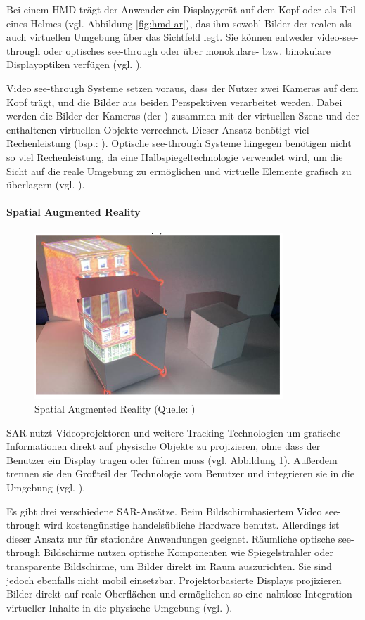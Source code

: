 Bei einem \ac{HMD} trägt der Anwender ein Displaygerät auf dem Kopf oder als Teil eines Helmes (vgl. Abbildung \ref{fig:hmd-ar}), das ihm sowohl Bilder der realen als auch virtuellen Umgebung über das Sichtfeld legt. Sie können entweder video-see-through oder optisches see-through oder über monokulare- bzw. binokulare Displayoptiken verfügen (vgl. \citealp[S. 346]{carmigniani_augmented_2011}).

Video see-through Systeme setzen voraus, dass der Nutzer zwei Kameras auf dem Kopf trägt, und die Bilder aus beiden Perspektiven verarbeitet werden. Dabei werden die Bilder der Kameras (der ) zusammen mit der virtuellen Szene und der enthaltenen virtuellen Objekte verrechnet. Dieser Ansatz benötigt viel Rechenleistung (bsp.: \cite{noauthor_vive_nodate}). Optische see-through Systeme hingegen benötigen nicht so viel Rechenleistung, da eine Halbspiegeltechnologie verwendet wird, um die Sicht auf die reale Umgebung zu ermöglichen und virtuelle Elemente grafisch zu überlagern (vgl. \citealp[S. 346f]{carmigniani_augmented_2011}).

\paragraph{Spatial Augmented Reality}
\begin{figure}[ht]
\centering
\includegraphics[width=0.5\linewidth]{content/pictures/spatial-ar.PNG}
\caption{Spatial Augmented Reality (Quelle: \citealp[S. 7]{jin_bim-based_2020})}
\label{fig:spatial-ar}
\end{figure}

\ac{SAR} nutzt Videoprojektoren und weitere Tracking-Technologien um grafische Informationen direkt auf physische Objekte zu projizieren, ohne dass der Benutzer ein Display tragen oder führen muss (vgl. Abbildung \ref{fig:spatial-ar}). Außerdem trennen sie den Großteil der Technologie vom Benutzer und integrieren sie in die Umgebung (vgl. \citealp[S. 348]{carmigniani_augmented_2011}).

Es gibt drei verschiedene \ac{SAR}-Ansätze. Beim Bildschirmbasiertem Video see-through wird kostengünstige handelsübliche Hardware benutzt. Allerdings ist dieser Ansatz nur für stationäre Anwendungen geeignet. Räumliche optische see-through Bildschirme nutzen optische Komponenten wie Spiegelstrahler oder transparente Bildschirme, um Bilder direkt im Raum auszurichten. Sie sind jedoch ebenfalls nicht mobil einsetzbar. Projektorbasierte Displays projizieren Bilder direkt auf reale Oberflächen und ermöglichen so eine nahtlose Integration virtueller Inhalte in die physische Umgebung (vgl. \citealp[S. 348]{carmigniani_augmented_2011}).

